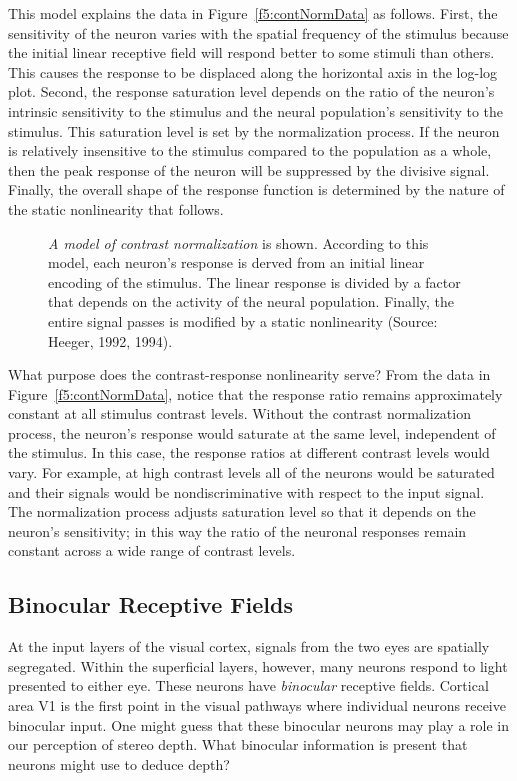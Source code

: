 This model explains the data in Figure~\ref{f5:contNormData} as follows.
First, the sensitivity of the neuron varies with the spatial
frequency of the stimulus because the initial linear receptive
field will respond better to some stimuli than others.
This causes the response to be displaced along the horizontal
axis in the log-log plot.
Second, the response saturation level depends on the
ratio of the neuron's intrinsic sensitivity to the stimulus
and the neural population's sensitivity to the stimulus.
This saturation level is set by the normalization process.
If the neuron is relatively insensitive to the stimulus compared
to the population as a whole, then the peak response of the neuron
will be suppressed by the divisive signal.
Finally, the overall shape of the response function is determined
by the nature of the static nonlinearity that follows.
\begin{figure}
\centerline{
}
\caption[Contrast normalization theory]{
{\em A model of contrast normalization} is shown.
According to this model,
each neuron's response is derved from
an initial linear encoding of the stimulus.
The linear response is divided
by a factor that depends on the
activity of the neural population.
Finally, the entire signal passes is modified by a static nonlinearity
(Source:  Heeger, 1992, 1994).
}
\label{f5:contNormModel}
\end{figure}

What purpose does the contrast-response nonlinearity serve?
From the data in Figure~\ref{f5:contNormData},
notice that the response ratio remains
approximately constant at all stimulus contrast levels.
Without the contrast normalization process,
the neuron's response would saturate at the same level,
independent of the stimulus.
In this case, the response ratios at different contrast levels
would vary.
For example, at high contrast levels all of the neurons would
be saturated and their signals would be nondiscriminative
with respect to the input signal.
The normalization process adjusts
saturation level so that it depends on the neuron's
sensitivity;
in this way the ratio of the neuronal responses
remain constant across a wide range of contrast levels.

\subsection*{Binocular Receptive Fields}
At the input layers of the visual cortex,
signals from the two eyes are spatially segregated.
Within the superficial layers, however,
many neurons respond to light presented to either eye.
These neurons have {\em binocular} receptive fields.
Cortical area V1 is the first point in the visual pathways 
where individual neurons receive binocular input.
One might guess that these binocular neurons may play a role
in our perception of stereo depth.
What binocular information is present
that neurons might use to deduce depth?


